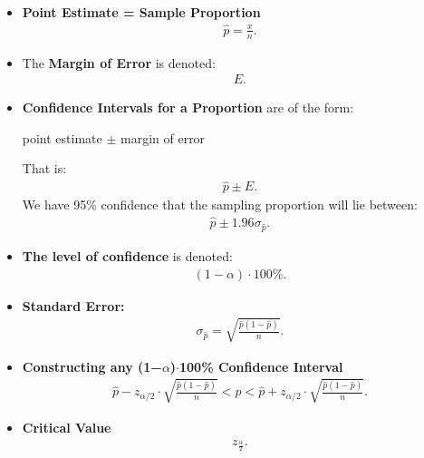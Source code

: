 \documentclass{report}
\begin{document}
    \begin{itemize}
        \item \textbf{Point Estimate = Sample Proportion}
            \begin{align*}
                \hat{p} = \frac{x}{n}
            .\end{align*}
        \item The \textbf{Margin of Error} is denoted:
            \begin{align*}
                E 
            .\end{align*}
        \item \textbf{Confidence Intervals for a Proportion} are of the form:
            \begin{center}
                point estimate $\pm $ margin of error
            \end{center}
            That is:
            \begin{align*}
               \hat{p} \pm E 
            .\end{align*}
            We have 95\% confidence that the sampling proportion will lie between:
            \begin{align*}
                \hat{p} \pm 1.96 \sigma_{\hat{p}}  
            .\end{align*}
        \item \textbf{The level of confidence} is denoted:
            \begin{align*}
                (1-\alpha) \cdot 100\%
            .\end{align*}
        \item \textbf{Standard Error:}
            \begin{align*}
                \sigma_{\hat{p}} = \sqrt{\frac{\hat{p}(1-\hat{p})}{n}}
            .\end{align*}
        \item \textbf{Constructing any (1−$\alpha $)$\cdot  $100\% Confidence Interval}
            \begin{align*}
                \hat{p} - z_{\alpha/2} \cdot \sqrt{\frac{\hat{p}(1-\hat{p})}{n}} < p < \hat{p} + z_{\alpha/2} \cdot \sqrt{\frac{\hat{p}(1-\hat{p})}{n}}
            .\end{align*}

        \item \textbf{Critical Value}
            \begin{align*}
                z_{ \frac{\alpha}{2}}
            .\end{align*}
            \bigbreak \noindent \bigbreak \noindent
        \end{itemize}
\end{document}
